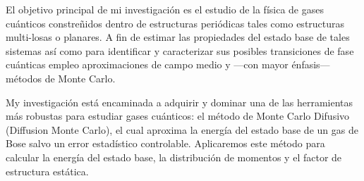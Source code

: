 El objetivo principal de mi investigación es el estudio de la física de gases cuánticos constreñidos dentro de
estructuras periódicas tales como estructuras multi-losas o planares. A fin de estimar las propiedades del estado base
de tales sistemas así como para identificar y caracterizar sus posibles transiciones de fase cuánticas empleo
aproximaciones de campo medio y ---con mayor énfasis--- métodos de Monte Carlo.

My investigación está encaminada a adquirir y dominar una de las herramientas más robustas para estudiar gases
cuánticos: el método de Monte Carlo Difusivo (Diffusion Monte Carlo), el cual aproxima
la energía del estado base de un gas de Bose salvo un error estadístico controlable. Aplicaremos este método para
calcular la energía del estado base, la distribución de momentos y el factor de estructura estática.


